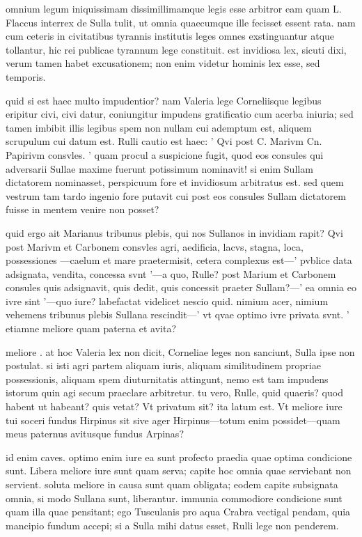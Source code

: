  omnium legum iniquissimam dissimillimamque legis esse arbitror eam quam L. Flaccus interrex de Sulla tulit, ut omnia quaecumque ille fecisset essent rata. nam cum ceteris in civitatibus tyrannis institutis leges omnes exstinguantur atque tollantur, hic rei publicae tyrannum lege constituit. est invidiosa lex, sicuti dixi, verum tamen habet excusationem; non enim videtur hominis lex esse, sed temporis.

 quid si est haec multo impudentior? nam Valeria lege Corneliisque legibus eripitur civi, civi datur, coniungitur impudens gratificatio cum acerba iniuria; sed tamen imbibit illis legibus spem non nullam cui ademptum est, aliquem scrupulum cui datum est. Rulli cautio est haec: ' Qvi post C. Marivm Cn. Papirivm consvles. ' quam procul a suspicione fugit, quod eos consules qui adversarii Sullae maxime fuerunt potissimum nominavit! si enim Sullam dictatorem nominasset, perspicuum fore et invidiosum arbitratus est. sed quem vestrum tam tardo ingenio fore putavit cui post eos consules Sullam dictatorem fuisse in mentem venire non posset?

 quid ergo ait Marianus tribunus plebis, qui nos Sullanos in invidiam rapit? Qvi post Marivm et Carbonem consvles agri, aedificia, lacvs, stagna, loca, possessiones —caelum et mare praetermisit, cetera complexus est—' pvblice data adsignata, vendita, concessa svnt '—a quo, Rulle? post Marium et Carbonem consules quis adsignavit, quis dedit, quis concessit praeter Sullam?—' ea omnia eo ivre sint '—quo iure? labefactat videlicet nescio quid. nimium acer, nimium vehemens tribunus plebis Sullana rescindit—' vt qvae optimo ivre privata svnt. ' etiamne meliore quam paterna et avita?

 meliore . at hoc Valeria lex non dicit, Corneliae leges non sanciunt, Sulla ipse non postulat. si isti agri partem aliquam iuris, aliquam similitudinem propriae possessionis, aliquam spem diuturnitatis attingunt, nemo est tam impudens istorum quin agi secum praeclare arbitretur. tu vero, Rulle, quid quaeris? quod habent ut habeant? quis vetat? Vt privatum sit? ita latum est. Vt meliore iure tui soceri fundus Hirpinus sit sive ager Hirpinus—totum enim possidet—quam meus paternus avitusque fundus Arpinas?

 id enim caves. optimo enim iure ea sunt profecto praedia quae optima condicione sunt. Libera meliore iure sunt quam serva; capite hoc omnia quae serviebant non servient. soluta meliore in causa sunt quam obligata; eodem capite subsignata omnia, si modo Sullana sunt, liberantur. immunia commodiore condicione sunt quam illa quae pensitant; ego Tusculanis pro aqua Crabra vectigal pendam, quia mancipio fundum accepi; si a Sulla mihi datus esset, Rulli lege non penderem.

